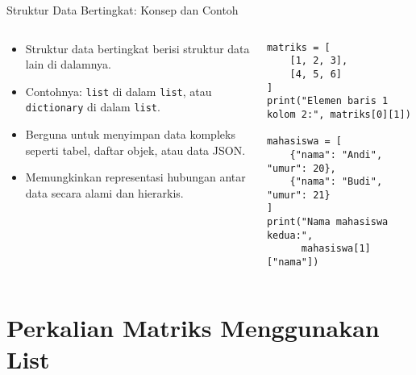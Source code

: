 \documentclass[aspectratio=169, table]{beamer}
\begin{document}
\begin{frame}[fragile]{Struktur Data Bertingkat: Konsep dan Contoh}
\vspace{20pt}

\begin{columns}[T]
  \begin{column}{0.48\textwidth}
    \begin{itemize}
      \item Struktur data bertingkat berisi struktur data lain di dalamnya.
      \item Contohnya: \texttt{list} di dalam \texttt{list}, atau \texttt{dictionary} di dalam \texttt{list}.
      \item Berguna untuk menyimpan data kompleks seperti tabel, daftar objek, atau data JSON.
      \item Memungkinkan representasi hubungan antar data secara alami dan hierarkis.
    \end{itemize}
  \end{column}

  \begin{column}{0.48\textwidth}
    \begin{lstlisting}[style=PythonStyle]
matriks = [
    [1, 2, 3],
    [4, 5, 6]
]
print("Elemen baris 1 kolom 2:", matriks[0][1])

mahasiswa = [
    {"nama": "Andi", "umur": 20},
    {"nama": "Budi", "umur": 21}
]
print("Nama mahasiswa kedua:",
      mahasiswa[1]["nama"])
    \end{lstlisting}
  \end{column}
\end{columns}

\end{frame}

\section{Perkalian Matriks Menggunakan List}
\end{document}
